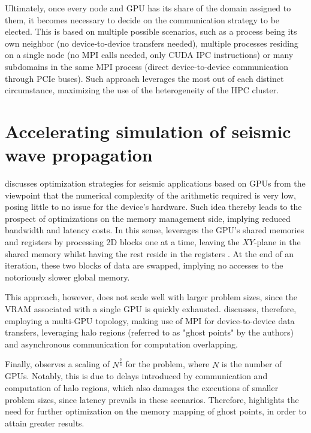 \documentclass[cic,tc,english]{infufrgs}
\begin{document}
Ultimately, once every node and GPU has its share of the domain
assigned to them,
it becomes necessary to decide on the communication strategy to be elected.
This is based on multiple possible scenarios, such as a process being its own
neighbor (no device-to-device transfers needed), multiple processes residing
on a single node (no MPI calls needed, only CUDA IPC instructions) or
many subdomains
in the same MPI process (direct device-to-device communication
through PCIe buses). Such approach leverages the most out of each distinct
circumstance, maximizing the use of the heterogeneity of the HPC cluster.

\section{Accelerating simulation of seismic wave propagation}
 discusses optimization strategies for
seismic applications
based on GPUs from the viewpoint that the numerical complexity of the arithmetic
required is very low, posing little to no issue for the device's hardware. Such
idea thereby leads to the prospect of optimizations on the memory
management side,
implying reduced bandwidth and latency costs. In this sense,
leverages the GPU's shared memories and registers by processing 2D blocks one
at a time, leaving the $XY$-plane in the shared memory whilst having
the rest reside
in the registers \cite{okamoto2010}. At the end of an iteration,
these two blocks of
data are swapped, implying no accesses to the notoriously slower global memory.

This approach, however, does not scale well with larger problem
sizes, since the VRAM associated with a single GPU is quickly exhausted.
 discusses, therefore, employing a multi-GPU topology,
making use of MPI for device-to-device data transfers, leveraging halo regions
(referred to as "ghost points" by the authors) and asynchronous
communication for computation overlapping.

Finally,  observes a scaling of $N^{\frac{2}{3}}$
for the problem,
where $N$ is the number of GPUs. Notably, this is due to delays
introduced by communication and computation of halo regions, which also
damages the executions of smaller problem sizes, since latency prevails
in these scenarios. Therefore,  highlights the need
for further optimization on the memory mapping of ghost points, in order
to attain greater results.
\end{document}
